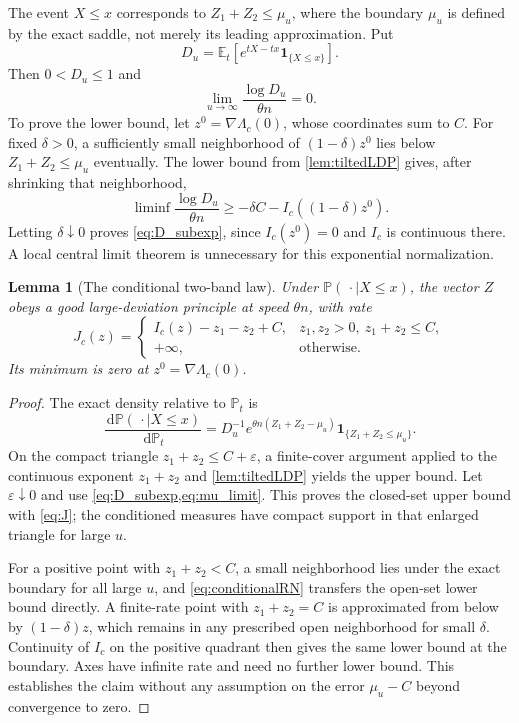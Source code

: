 \documentclass[11pt,letterpaper]{article}
\numberwithin{equation}{section}
\newtheorem{lemma}[theorem]{Lemma}
\theoremstyle{definition}
\theoremstyle{remark}
\newcommand{\PP}{\mathbb P}
\newcommand{\EE}{\mathbb E}
\newcommand{\dd}{\,\mathrm d}
\newcommand{\ind}{\mathbf 1}
\begin{document}
The event $X\le x$ corresponds to $Z_1+Z_2\le\mu_u$, where the boundary $\mu_u$ is defined by the exact saddle, not merely its leading approximation. Put
\begin{equation}\label{eq:D_u}
 D_u=\EE_t[e^{tX-tx}\ind_{\{X\le x\}}].
\end{equation}
Then $0<D_u\le1$ and
\begin{equation}\label{eq:D_subexp}
 \lim_{u\to\infty}\frac{\log D_u}{\theta n}=0.
\end{equation}
To prove the lower bound, let $z^0=\nabla\Lambda_c(0)$, whose coordinates sum to $C$. For fixed $\delta>0$, a sufficiently small neighborhood of $(1-\delta)z^0$ lies below $Z_1+Z_2\le\mu_u$ eventually. The lower bound from \cref{lem:tiltedLDP} gives, after shrinking that neighborhood,
\[
 \liminf\frac{\log D_u}{\theta n}
 \ge-\delta C-I_c((1-\delta)z^0).
\]
Letting $\delta\downarrow0$ proves \cref{eq:D_subexp}, since $I_c(z^0)=0$ and $I_c$ is continuous there. A local central limit theorem is unnecessary for this exponential normalization.

\begin{lemma}[The conditional two-band law]\label{lem:conditionalLDP}
Under $\PP(\,\cdot\mid X\le x)$, the vector $Z$ obeys a good large-deviation principle at speed $\theta n$, with rate
\begin{equation}\label{eq:J}
 J_c(z)=\begin{cases}
 I_c(z)-z_1-z_2+C,&z_1,z_2>0,\ z_1+z_2\le C,\\
 +\infty,&\text{otherwise}.
 \end{cases}
\end{equation}
Its minimum is zero at $z^0=\nabla\Lambda_c(0)$.
\end{lemma}

\begin{proof}
The exact density relative to $\PP_t$ is
\begin{equation}\label{eq:conditionalRN}
 \frac{\dd\PP(\,\cdot\mid X\le x)}{\dd\PP_t}
 =D_u^{-1}e^{\theta n(Z_1+Z_2-\mu_u)}
 \ind_{\{Z_1+Z_2\le\mu_u\}}.
\end{equation}
On the compact triangle $z_1+z_2\le C+\varepsilon$, a finite-cover argument applied to the continuous exponent $z_1+z_2$ and \cref{lem:tiltedLDP} yields the upper bound. Let $\varepsilon\downarrow0$ and use \cref{eq:D_subexp,eq:mu_limit}. This proves the closed-set upper bound with \cref{eq:J}; the conditioned measures have compact support in that enlarged triangle for large $u$.

For a positive point with $z_1+z_2<C$, a small neighborhood lies under the exact boundary for all large $u$, and \cref{eq:conditionalRN} transfers the open-set lower bound directly. A finite-rate point with $z_1+z_2=C$ is approximated from below by $(1-\delta)z$, which remains in any prescribed open neighborhood for small $\delta$. Continuity of $I_c$ on the positive quadrant then gives the same lower bound at the boundary. Axes have infinite rate and need no further lower bound. This establishes the claim without any assumption on the error $\mu_u-C$ beyond convergence to zero.
\end{proof}
\end{document}
